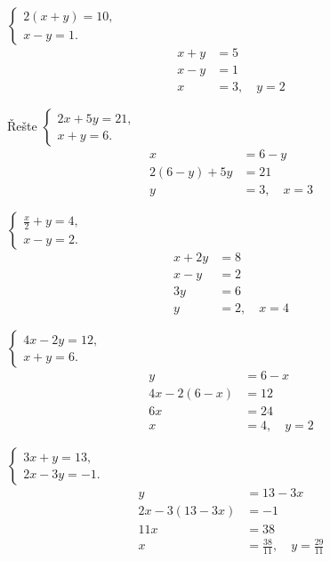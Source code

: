 \documentclass[11pt,a4paper]{article}
\begin{document}
\begin{zadaniReseniBox}[title={Úloha 3}]
$\begin{cases}2(x+y)=10,\\x-y=1.\end{cases}$
\tcblower
\begin{align*}
x+y&=5 \\
 x-y&=1 \\
 x&=3,\quad y=2
\end{align*}
\end{zadaniReseniBox}
\begin{zadaniReseniBox}[title={Úloha 1}]
Řešte $\begin{cases}2x+5y=21,\\x+y=6.\end{cases}$
\tcblower
\begin{align*}
x&=6-y \\
 2(6-y)+5y&=21 \\
 y&=3,\quad x=3
\end{align*}
\end{zadaniReseniBox}
\begin{zadaniReseniBox}[title={Úloha 1}]
$\begin{cases}\frac x2+y=4,\\x-y=2.\end{cases}$
\tcblower
\begin{align*}
x+2y&=8 \\
 x-y&=2 \\
 3y&=6 \\
 y&=2,\quad x=4
\end{align*}
\end{zadaniReseniBox}
\begin{zadaniReseniBox}[title={Úloha 2}]
$\begin{cases}4x-2y=12,\\x+y=6.\end{cases}$
\tcblower
\begin{align*}
y&=6-x \\
 4x-2(6-x)&=12 \\
 6x&=24 \\
 x&=4,\quad y=2
\end{align*}
\end{zadaniReseniBox}
\begin{zadaniReseniBox}[title={Úloha 3}]
$\begin{cases}3x+y=13,\\2x-3y=-1.\end{cases}$
\tcblower
\begin{align*}
y&=13-3x \\
 2x-3(13-3x)&=-1 \\
 11x&=38 \\
 x&=\frac{38}{11},\quad y=\frac{29}{11}
\end{align*}
\end{zadaniReseniBox}
\end{document}
